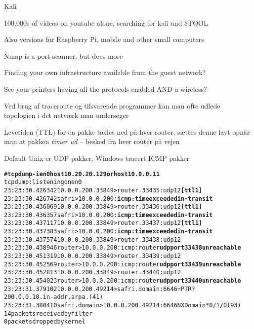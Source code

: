 \documentclass[Screen16to9,17pt]{foils}
\begin{document}

\begin{list1}
\item  Kali 
\item 100.000s of videos on youtube alone, searching for kali and \$TOOL
\item Also versions for Raspberry Pi, mobile and other small computers
\end{list1}



\begin{list2}
\item Nmap is a port scanner, but does more
\item Finding your own infrastructure available from the guest network?
\item See your printers having all the protocols enabled AND a wireless?
\end{list2}



\begin{list1}
\item Ved brug af traceroute og tilsvarende programmer kan man ofte
  udlede topologien i det netværk man undersøger
\item Levetiden (TTL) for en pakke tælles ned på hver router, sættes denne lavt
  opnår man at pakken \emph{timer ud} -- besked fra hver router på vejen
\item Default Unix er UDP pakker, Windows tracert ICMP pakker
\end{list1}



\begin{alltt}
\footnotesize # {\bfseries tcpdump -i en0 host 10.20.20.129 or host 10.0.0.11}
tcpdump: listening on en0
23:23:30.426342 10.0.0.200.33849 > router.33435: udp 12 {\bf [ttl 1]}
23:23:30.426742 safri > 10.0.0.200: {\bf icmp: time exceeded in-transit}
23:23:30.436069 10.0.0.200.33849 > router.33436: udp 12 {\bf [ttl 1]}
23:23:30.436357 safri > 10.0.0.200: {\bf icmp: time exceeded in-transit}
23:23:30.437117 10.0.0.200.33849 > router.33437: udp 12 {\bf [ttl 1]}
23:23:30.437383 safri > 10.0.0.200: {\bf icmp: time exceeded in-transit}
23:23:30.437574 10.0.0.200.33849 > router.33438: udp 12
23:23:30.438946 router > 10.0.0.200: icmp: router {\bf udp port 33438 unreachable}
23:23:30.451319 10.0.0.200.33849 > router.33439: udp 12
23:23:30.452569 router > 10.0.0.200: icmp: router {\bf udp port 33439 unreachable}
23:23:30.452813 10.0.0.200.33849 > router.33440: udp 12
23:23:30.454023 router > 10.0.0.200: icmp: router {\bf udp port 33440 unreachable}
23:23:31.379102 10.0.0.200.49214 > safri.domain:  6646+ PTR?
200.0.0.10.in-addr.arpa. (41)
23:23:31.380410 safri.domain > 10.0.0.200.49214:  6646 NXDomain* 0/1/0 (93)
14 packets received by filter
0 packets dropped by kernel
\end{alltt}
\end{document}
